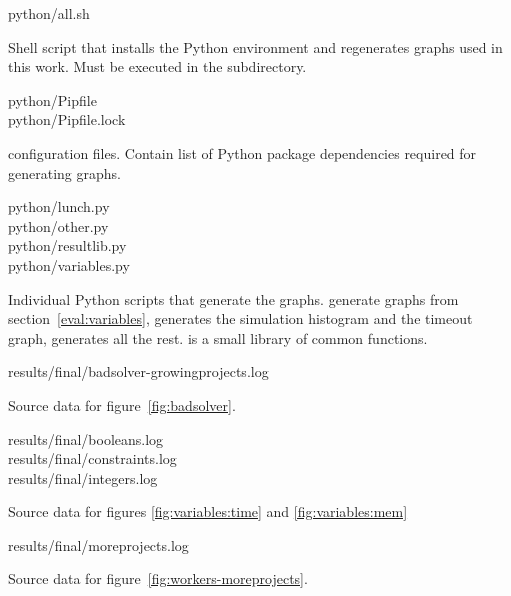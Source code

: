 \begin{filepath}
python/all.sh
\end{filepath}
\begin{dsldesc}
    Shell script that installs the Python environment and regenerates graphs used in
    this work. Must be executed in the  subdirectory.
\end{dsldesc}

\begin{filepath}
python/Pipfile\\
python/Pipfile.lock
\end{filepath}
\begin{dsldesc}
     configuration files. Contain list of Python package dependencies
    required for generating graphs.
\end{dsldesc}

\begin{filepath}
python/lunch.py\\
python/other.py\\
python/resultlib.py\\
python/variables.py
\end{filepath}
\begin{dsldesc}
    Individual Python scripts that generate the graphs.  generate
    graphs from section~\ref{eval:variables},  generates the simulation
    histogram and the timeout graph,  generates all the rest.
     is a small library of common functions.
\end{dsldesc}

\begin{filepath}
results/final/badsolver-growingprojects.log
\end{filepath}
\begin{dsldesc}
    Source data for figure~\ref{fig:badsolver}.
\end{dsldesc}

\pagebreak
\begin{filepath}
results/final/booleans.log\\
results/final/constraints.log\\
results/final/integers.log
\end{filepath}
\begin{dsldesc}
    Source data for figures \ref{fig:variables:time} and \ref{fig:variables:mem}
\end{dsldesc}

\begin{filepath}
results/final/moreprojects.log
\end{filepath}
\begin{dsldesc}
    Source data for figure~\ref{fig:workers-moreprojects}.
\end{dsldesc}

